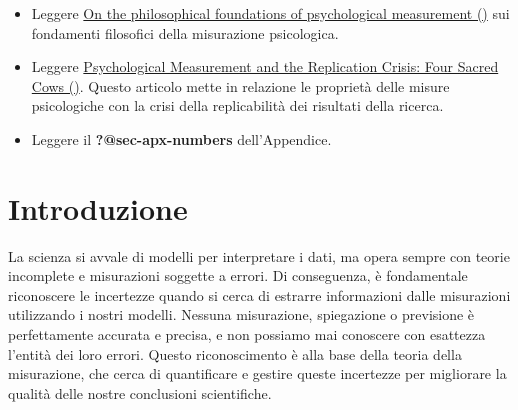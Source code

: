 \documentclass[
  letterpaper,
]{krantz}
\providecommand{\tightlist}{%
  \setlength{\itemsep}{0pt}\setlength{\parskip}{0pt}}\usepackage{longtable,booktabs,array}
\begin{document}
\begin{tcolorbox}[enhanced jigsaw, toprule=.15mm, breakable, bottomrule=.15mm, colback=white, colbacktitle=quarto-callout-tip-color!10!white, left=2mm, toptitle=1mm, colframe=quarto-callout-tip-color-frame, coltitle=black, opacitybacktitle=0.6, bottomtitle=1mm, titlerule=0mm, leftrule=.75mm, opacityback=0, rightrule=.15mm, title=\textcolor{quarto-callout-tip-color}{\faLightbulb}\hspace{0.5em}{Prerequisiti}, arc=.35mm]

\begin{itemize}
\tightlist
\item
  Leggere
  \href{https://www.sciencedirect.com/science/article/pii/S0263224115005801?casa_token=QTLWp2GIWswAAAAA:wmewUxxK68plnyJhu51VMpVSnI4rB5wB36p4l1KlKarbFwhFTuIWUS7V5ZHdfhoqSqiy4JJoqg}{On
  the philosophical foundations of psychological measurement
  ()} sui
  fondamenti filosofici della misurazione psicologica.
\item
  Leggere
  \href{https://web.p.ebscohost.com/ehost/pdfviewer/pdfviewer?vid=0&sid=52940ed5-6696-4f73-be23-b5f868703f25\%40redis}{Psychological
  Measurement and the Replication Crisis: Four Sacred Cows
  ()}. Questo articolo mette in relazione le proprietà delle misure
  psicologiche con la crisi della replicabilità dei risultati della
  ricerca.
\item
  Leggere il \textbf{?@sec-apx-numbers} dell'Appendice.
\end{itemize}

\end{tcolorbox}

\section{Introduzione}\label{introduzione-2}

La scienza si avvale di modelli per interpretare i dati, ma opera sempre
con teorie incomplete e misurazioni soggette a errori. Di conseguenza, è
fondamentale riconoscere le incertezze quando si cerca di estrarre
informazioni dalle misurazioni utilizzando i nostri modelli. Nessuna
misurazione, spiegazione o previsione è perfettamente accurata e
precisa, e non possiamo mai conoscere con esattezza l'entità dei loro
errori. Questo riconoscimento è alla base della teoria della
misurazione, che cerca di quantificare e gestire queste incertezze per
migliorare la qualità delle nostre conclusioni scientifiche.
\end{document}
